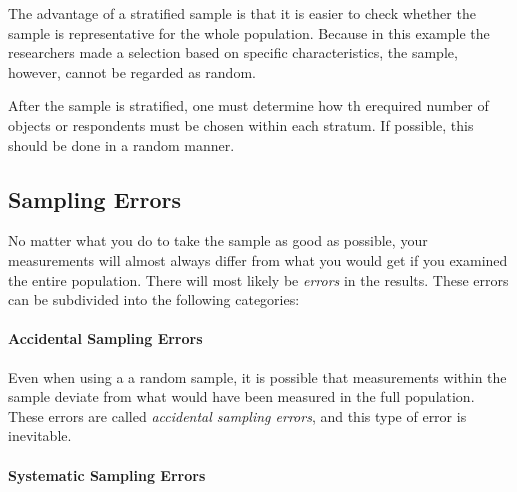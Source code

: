 The advantage of a stratified sample is that it is easier to check whether the sample is representative for the whole population. 
Because in this example the researchers made a selection based on specific characteristics, the sample, however, cannot be regarded as random.

After the sample is stratified, one must determine how th erequired number of objects or respondents must be chosen within each stratum. If possible, this should be done in a random manner.



\subsection{Sampling Errors}

No matter what you do to take the sample as good as possible, your measurements will almost always differ from what you would get if you examined the entire population. There will most likely be \emph{errors} in the results. These errors can be subdivided into the following categories:


\paragraph{Accidental Sampling Errors}

Even when using a a random sample, it is possible that measurements within the sample deviate from what would have been measured in the full population. These errors are called \emph{accidental sampling errors}, and this type of error is inevitable.


\paragraph{Systematic Sampling Errors}

